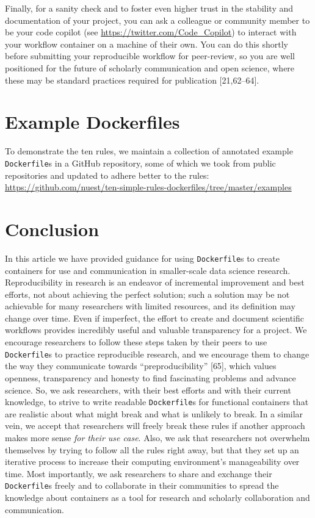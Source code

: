 \documentclass[10pt,letterpaper]{article}
\begin{document}
Finally, for a sanity check and to foster even higher trust in the
stability and documentation of your project, you can ask a colleague or
community member to be your code copilot (see
\url{https://twitter.com/Code_Copilot}) to interact with your workflow
container on a machine of their own. You can do this shortly before
submitting your reproducible workflow for peer-review, so you are well
positioned for the future of scholarly communication and open science,
where these may be standard practices required for publication
{[}21,62--64{]}.

\hypertarget{example-dockerfiles}{%
\section{Example Dockerfiles}\label{example-dockerfiles}}

To demonstrate the ten rules, we maintain a collection of annotated
example \texttt{Dockerfile}s in a GitHub repository, some of which we
took from public repositories and updated to adhere better to the rules:
\url{https://github.com/nuest/ten-simple-rules-dockerfiles/tree/master/examples}

\hypertarget{conclusion}{%
\section*{Conclusion}\label{conclusion}}

In this article we have provided guidance for using \texttt{Dockerfile}s
to create containers for use and communication in smaller-scale data
science research. Reproducibility in research is an endeavor of
incremental improvement and best efforts, not about achieving the
perfect solution; such a solution may be not achievable for many
researchers with limited resources, and its definition may change over
time. Even if imperfect, the effort to create and document scientific
workflows provides incredibly useful and valuable transparency for a
project. We encourage researchers to follow these steps taken by their
peers to use \texttt{Dockerfile}s to practice reproducible research, and
we encourage them to change the way they communicate towards
``preproducibility'' {[}65{]}, which values openness, transparency and
honesty to find fascinating problems and advance science. So, we ask
researchers, with their best efforts and with their current knowledge,
to strive to write readable \texttt{Dockerfile}s for functional
containers that are realistic about what might break and what is
unlikely to break. In a similar vein, we accept that researchers will
freely break these rules if another approach makes more sense \emph{for
their use case}. Also, we ask that researchers not overwhelm themselves
by trying to follow all the rules right away, but that they set up an
iterative process to increase their computing environment's
manageability over time. Most importantly, we ask researchers to share
and exchange their \texttt{Dockerfile}s freely and to collaborate in
their communities to spread the knowledge about containers as a tool for
research and scholarly collaboration and communication.
\end{document}

